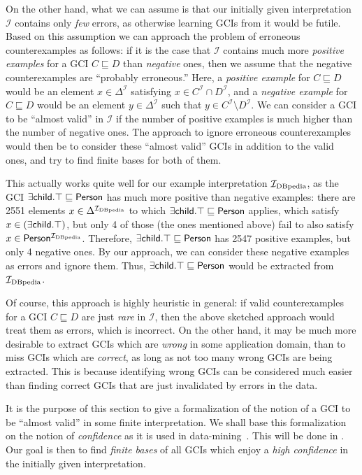 On the other hand, what we can assume is that our initially given interpretation
$\mathcal{I}$ contains only \emph{few} errors, as otherwise learning GCIs from it would be
futile.  Based on this assumption we can approach the problem of erroneous counterexamples
as follows: if it is the case that $\mathcal{I}$ contains much more \emph{positive
  examples} for a GCI $C \sqsubseteq D$ than \emph{negative} ones, then we assume that the
negative counterexamples are ``probably erroneous.''  Here, a \emph{positive example} for
$C \sqsubseteq D$ would be an element $x \in \Delta^{\mathcal{I}}$ satisfying $x \in
C^{\mathcal{I}} \cap D^{\mathcal{I}}$, and a \emph{negative example} for $C \sqsubseteq D$
would be an element $y \in \Delta^{\mathcal{I}}$ such that $y \in C^{\mathcal{I}}
\setminus D^{\mathcal{I}}$.  We can consider a GCI to be ``almost valid'' in $\mathcal{I}$
if the number of positive examples is much higher than the number of negative ones.  The
approach to ignore erroneous counterexamples would then be to consider these ``almost
valid'' GCIs in addition to the valid ones, and try to find finite bases for both of them.

This actually works quite well for our example interpretation ${\mathcal{I}_{\text{DBpedia}}}$, as the GCI $\sf
\exists child. \top \sqsubseteq Person$ has much more positive than negative examples:
there are 2551 elements $x \in \Delta^{{\mathcal{I}_{\text{DBpedia}}}}$ to which $\sf \exists child. \top
\sqsubseteq Person$ applies, \ie which satisfy $x \in (\sf \exists child. \top)$, but only
4 of those (the ones mentioned above) fail to also satisfy $x \in \sf Person^{{\mathcal{I}_{\text{DBpedia}}}}$.
Therefore, $\sf \exists child. \top \sqsubseteq Person$ has 2547 positive examples, but
only 4 negative ones.  By our approach, we can consider these negative examples as errors
and ignore them.  Thus, $\sf \exists child. \top \sqsubseteq Person$ would be extracted
from ${\mathcal{I}_{\text{DBpedia}}}$.

Of course, this approach is highly heuristic in general: if valid counterexamples for a
GCI $C \sqsubseteq D$ are just \emph{rare} in $\mathcal{I}$, then the above sketched
approach would treat them as errors, which is incorrect.  On the other hand, it may be
much more desirable to extract GCIs which are \emph{wrong} in some application domain,
than to miss GCIs which are \emph{correct}, as long as not too many wrong GCIs are being
extracted.  This is because identifying wrong GCIs can be considered much easier than
finding correct GCIs that are just invalidated by errors in the data.

It is the purpose of this section to give a formalization of the notion of a GCI to be
``almost valid'' in some finite interpretation.  We shall base this formalization on the
notion of \emph{confidence} as it is used in
data-mining~\cite{arules:agrawal:association-rules}.  This will be done in
.  Our goal is then to find \emph{finite bases} of all GCIs which
enjoy a \emph{high confidence} in the initially given interpretation.

